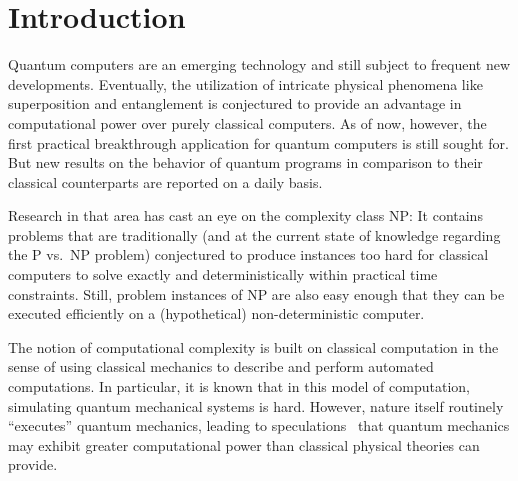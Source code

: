 \section{Introduction}


Quantum computers are an emerging technology and still subject to frequent new developments. Eventually, the utilization of intricate physical phenomena like superposition and entanglement is conjectured to provide an advantage in computational power over purely classical computers. As of now, however, the first practical breakthrough application for quantum computers is still sought for. But new results on the behavior of quantum programs in comparison to their classical counterparts are reported on a daily basis.

Research in that area has cast an eye on the complexity class NP: It contains problems that are traditionally (and at the current state of knowledge regarding the P vs.\ NP problem) conjectured to produce instances too hard for classical computers to solve exactly and deterministically within practical time constraints. Still, problem instances of NP are also easy enough that they can be executed efficiently on a (hypothetical) non-deterministic computer.

The notion of computational complexity is built on classical
computation in the sense of using classical mechanics to describe and
perform automated computations. In particular, it is known that in this
model of computation, simulating quantum mechanical systems is hard. However, nature itself routinely ``executes'' quantum mechanics, leading to
speculations~\cite{feynman1981simulating} that quantum mechanics may
 exhibit greater computational power than classical physical theories
can provide.

